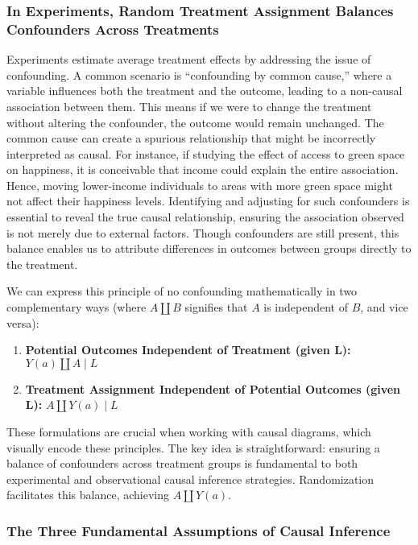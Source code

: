 \documentclass[
  singlecolumn]{article}
\providecommand{\tightlist}{%
  \setlength{\itemsep}{0pt}\setlength{\parskip}{0pt}}\usepackage{longtable,booktabs,array}
\begin{document}
\subsubsection{In Experiments, Random Treatment Assignment Balances
Confounders Across
Treatments}\label{in-experiments-random-treatment-assignment-balances-confounders-across-treatments}

Experiments estimate average treatment effects by addressing the issue
of confounding. A common scenario is ``confounding by common cause,''
where a variable influences both the treatment and the outcome, leading
to a non-causal association between them. This means if we were to
change the treatment without altering the confounder, the outcome would
remain unchanged. The common cause can create a spurious relationship
that might be incorrectly interpreted as causal. For instance, if
studying the effect of access to green space on happiness, it is
conceivable that income could explain the entire association. Hence,
moving lower-income individuals to areas with more green space might not
affect their happiness levels. Identifying and adjusting for such
confounders is essential to reveal the true causal relationship,
ensuring the association observed is not merely due to external factors.
Though confounders are still present, this balance enables us to
attribute differences in outcomes between groups directly to the
treatment.

We can express this principle of no confounding mathematically in two
complementary ways (where \(A \coprod B\) signifies that \(A\) is
independent of \(B\), and vice versa):

\begin{enumerate}
\def\labelenumi{\arabic{enumi}.}
\tightlist
\item
  \textbf{Potential Outcomes Independent of Treatment (given L):}
  \(Y(a) \coprod A \mid L\)
\item
  \textbf{Treatment Assignment Independent of Potential Outcomes (given
  L):} \(A \coprod Y(a) \mid L\)
\end{enumerate}

These formulations are crucial when working with causal diagrams, which
visually encode these principles. The key idea is straightforward:
ensuring a balance of confounders across treatment groups is fundamental
to both experimental and observational causal inference strategies.
Randomization facilitates this balance, achieving \(A \coprod Y(a)\).

\subsubsection{The Three Fundamental Assumptions of Causal
Inference}\label{sec-three-fundamental-assumptions}
\end{document}
